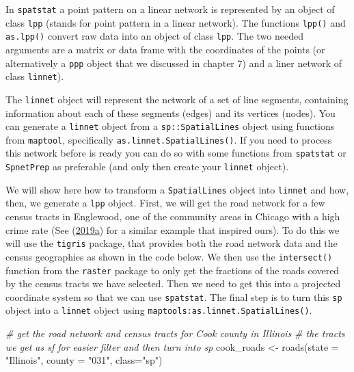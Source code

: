 \documentclass[
  krantz2]{krantz}
\makeatletter
\newenvironment{Shaded}{\begin{snugshade}}{\end{snugshade}}
\newcommand{\AttributeTok}[1]{\textcolor[rgb]{0.61,0.61,0.61}{#1}}
\newcommand{\CommentTok}[1]{\textcolor[rgb]{0.37,0.37,0.37}{\textit{#1}}}
\newcommand{\FunctionTok}[1]{\textcolor[rgb]{0,0,0}{#1}}
\newcommand{\NormalTok}[1]{#1}
\newcommand{\OtherTok}[1]{\textcolor[rgb]{0.37,0.37,0.37}{#1}}
\newcommand{\StringTok}[1]{\textcolor[rgb]{0.5,0.5,0.5}{#1}}
\newenvironment{kframe}{%
\medskip{}
\setlength{\fboxsep}{.8em}
 \def\at@end@of@kframe{}%
 \ifinner\ifhmode%
  \def\at@end@of@kframe{\end{minipage}}%
  \begin{minipage}{\columnwidth}%
 \fi\fi%
 \def\FrameCommand##1{\hskip\@totalleftmargin \hskip-\fboxsep
 \colorbox{shadecolor}{##1}\hskip-\fboxsep
     \hskip-\linewidth \hskip-\@totalleftmargin \hskip\columnwidth}%
 \MakeFramed {\advance\hsize-\width
   \@totalleftmargin\z@ \linewidth\hsize
   \@setminipage}}%
 {\par\unskip\endMakeFramed%
 \at@end@of@kframe}
\renewenvironment{Shaded}{\begin{kframe}}{\end{kframe}}
\makeatother
\begin{document}
In \texttt{spatstat} a point pattern on a linear network is represented by an object of class \texttt{lpp} (stands for point pattern in a linear network). The functions \texttt{lpp()} and \texttt{as.lpp()} convert raw data into an object of class \texttt{lpp}. The two needed arguments are a matrix or data frame with the coordinates of the points (or alternatively a \texttt{ppp} object that we discussed in chapter 7) and a liner network of class \texttt{linnet}).

The \texttt{linnet} object will represent the network of a set of line segments, containing information about each of these segments (edges) and its vertices (nodes). You can generate a \texttt{linnet} object from a \texttt{sp::SpatialLines} object using functions from \texttt{maptool}, specifically \texttt{as.linnet.SpatialLines()}. If you need to process this network before is ready you can do so with some functions from \texttt{spatstat} or \texttt{SpnetPrep} as preferable (and only then create your \texttt{linnet} object).

We will show here how to transform a \texttt{SpatialLines} object into \texttt{linnet} and how, then, we generate a \texttt{lpp} object. First, we will get the road network for a few census tracts in Englewood, one of the community areas in Chicago with a high crime rate (See (\protect\hyperlink{ref-BrizRedon_2019a}{2019a}) for a similar example that inspired ours). To do this we will use the \texttt{tigris} package, that provides both the road network data and the census geographies as shown in the code below. We then use the \texttt{intersect()} function from the \texttt{raster} package to only get the fractions of the roads covered by the census tracts we have selected. Then we need to get this into a projected coordinate system so that we can use \texttt{spatstat}. The final step is to turn this \texttt{sp} object into a \texttt{linnet} object using \texttt{maptools:as.linnet.SpatialLines()}.

\begin{Shaded}
\begin{Highlighting}[]
\CommentTok{\# get the road network and census tracts for Cook county in Illinois}
\CommentTok{\# the tracts we get as sf for easier filter and then turn into sp}
\NormalTok{cook\_roads }\OtherTok{\textless{}{-}} \FunctionTok{roads}\NormalTok{(}\AttributeTok{state =} \StringTok{"Illinois"}\NormalTok{, }\AttributeTok{county =} \StringTok{"031"}\NormalTok{, }\AttributeTok{class=}\StringTok{"sp"}\NormalTok{)}
\end{Highlighting}
\end{Shaded}
\end{document}
